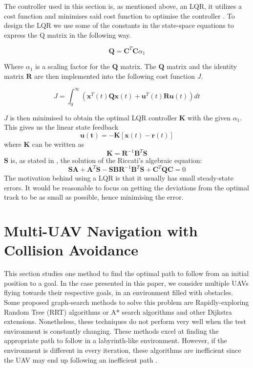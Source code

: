 \documentclass[journal]{IEEEtran}
\begin{document}
	The controller used in this section is, as mentioned above, an LQR, it utilizes a cost function and minimises said cost function to optimise the controller \cite{bokLQ}. To design the LQR we use some of the constants in the state-space equations to express the Q matrix in the following way.
	
	\begin{equation}
	\bm{Q}=\bm{C}^{T}\bm{C}\alpha_{1}
	\end{equation}
	
	Where $\alpha_{1}$ is a scaling factor for the $\bm{Q}$ matrix.
	The $\bm{Q}$ matrix and the identity matrix $\bm{R}$ are then implemented into the following cost function $J$.
	
	\begin{equation}\label{eq:costfunctionJ}
	J = \int_{0}^{\infty} (\bm{x}^{T}(t)\bm{Q}\bm{x}(t)+\bm{u}^{T}(t)\bm{R}\bm{u}(t)) dt
	\end{equation}
	
	$J$ is then minimised to obtain the optimal LQR controller $\bm{K}$ with the given $\alpha_{1}$. This gives us the	linear state  feedback
	\begin{equation}\label{eq:linearstatefeedback}
	\bm{u(t)} = -\bm{K}[\bm{x}(t)-\bm{r}(t)]
\end{equation}
	where $\bm{K}$ can be written as		
	\begin{equation}\label{eq:linearstatefeedback2}
		\bm{K} = \bm{R}^{-1}\bm{B}^T\bm{S}
	\end{equation}
		$\bm{S}$ is, as stated in \cite{mod_control_bresciani}, the solution of the Riccati's algebraic equation: 
	\begin{equation}\label{eq:linearstatefeedback3}
		\bm{S}\bm{A} + \bm{A}^T\bm{S} - \bm{S}\bm{B}\bm{R}^{-1}\bm{B}^T\bm{S} + \bm{C}^T\bm{Q}\bm{C} = 0
	\end{equation}	
	 The motivation behind using a LQR is that it usually has small steady-state errors\cite{lqr_error}. It would be reasonable to focus on getting the deviations from the optimal track to be as small as possible, hence minimising the error.   
	
		
	\section{Multi-UAV Navigation with Collision Avoidance}\label{navigation}
		This section studies one method to find the optimal path to follow from an initial position to a goal. In the case presented in this paper, we consider multiple UAVs flying towards their respective goals, in an environment filled with obstacles. Some proposed graph-search methods to solve this problem are Rapidly-exploring Random Tree (RRT) algorithms or A* search algorithms and other Dijkstra extensions.	Nonetheless, these techniques do not perform very well when the test environment is constantly changing. These methods excel at finding the appropriate path to follow in a labyrinth-like environment. However, if the environment is different in every iteration, these algorithms are inefficient since the UAV may end up following an inefficient path \cite{lavalle_rrt, lavalle_astar}.\\
		
\end{document}
